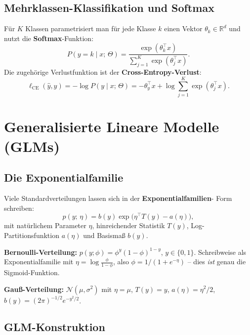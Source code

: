 \documentclass[11pt]{article}
\theoremstyle{csthm}
\theoremstyle{csdef}
\newcommand{\R}{\mathbb{R}}
\newcommand{\N}{\mathcal{N}}
\newcommand{\T}{^\top}
\begin{document}
\subsection{Mehrklassen-Klassifikation und Softmax}

Für $K$ Klassen parametrisiert man für jede Klasse $k$ einen Vektor
$\theta_k \in \R^d$ und nutzt die \textbf{Softmax}-Funktion:
\begin{equation}
  P(y = k \mid x;\,\Theta)
  = \frac{\exp(\theta_k\T x)}{\sum_{j=1}^K \exp(\theta_j\T x)}.
\end{equation}
Die zugehörige Verlustfunktion ist der \textbf{Cross-Entropy-Verlust}:
\begin{equation}
  \ell_\mathrm{CE}(\hat{y}, y)
  = -\log P(y \mid x;\,\Theta)
  = -\theta_y\T x + \log\sum_{j=1}^K \exp(\theta_j\T x).
\end{equation}

\section{Generalisierte Lineare Modelle (GLMs)}

\subsection{Die Exponentialfamilie}

Viele Standardverteilungen lassen sich in der \textbf{Exponentialfamilien}-
Form schreiben:
\begin{equation}
  p(y;\,\eta) = b(y)\exp\!\bigl(\eta\T T(y) - a(\eta)\bigr),
\end{equation}
mit natürlichem Parameter $\eta$, hinreichender Statistik $T(y)$,
Log-Partitionsfunktion $a(\eta)$ und Basismaß $b(y)$.

\begin{tcolorbox}[defstyle]
\textbf{Bernoulli-Verteilung:} $p(y;\phi) = \phi^y(1-\phi)^{1-y}$,
$y\in\{0,1\}$. Schreibweise als Exponentialfamilie mit
$\eta = \log\frac{\phi}{1-\phi}$, also $\phi = 1/(1+e^{-\eta})$ -- dies
\emph{ist} genau die Sigmoid-Funktion.

\medskip
\textbf{Gauß-Verteilung:} $\N(\mu, \sigma^2)$ mit $\eta = \mu$, $T(y) = y$,
$a(\eta) = \eta^2/2$, $b(y) = (2\pi)^{-1/2}e^{-y^2/2}$.
\end{tcolorbox}

\subsection{GLM-Konstruktion}
\end{document}
